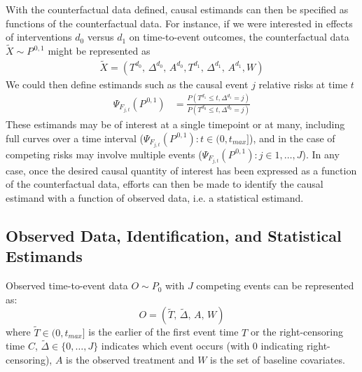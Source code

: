 \documentclass{report}
\newcommand{\1}{\ensuremath{\mathbf{1}}}
\newcommand{\T}{\ensuremath{\widetilde{T}}}
\renewcommand{\L}{\ensuremath{W}}
\newcommand{\tDelta}{\ensuremath{\widetilde{\Delta}}}
\begin{document}
With the counterfactual data defined, causal estimands can then be specified as functions of the counterfactual data. For instance, if we were interested in effects of interventions \(d_0\) versus \(d_1\) on time-to-event outcomes, the counterfactual data \(\tilde{X} \sim P^{\,0,1}\) might be represented as
\begin{align*}
\tilde{X} = \left(T^{d_0},\, \Delta^{d_0},\, A^{d_0}, T^{d_1},\, \Delta^{d_1},\, A^{d_1}, \L \right)
\end{align*}
We could then define estimands such as the causal event \(j\) relative risks at time \(t\) 
\begin{align}
\Psi_{F_{j,t}}(P^{\,0,1}) &= \frac{{P}(T^{d_1} \leq t, \Delta^{d_1} = j)}{{P}(T^{d_{0}} \leq t, \Delta^{d_{0}} = j)}
\label{causalrisk}
\end{align}
These estimands may be of interest at a single timepoint or at many, including full curves over a time interval (\(\Psi_{F_{j,t}}(P^{\,0,1}) : t \in (0, t_{max}]\)), and in the case of competing risks may involve multiple events (\(\Psi_{F_{j,t}}(P^{\,0, 1}) : j \in 1, \dots, J\)). In any case, once the desired causal quantity of interest has been expressed as a function of the counterfactual data, efforts can then be made to identify the causal estimand with a function of observed data, i.e. a statistical estimand.

\subsection{Observed Data, Identification, and Statistical Estimands}
\label{ObservedData}
Observed time-to-event data \(O \sim P_0\) with \(J\) competing events can be represented as:
\begin{equation}
 O = \left(\T,\, \tDelta,\, A,\, \L \right) \label{obs-data}
\end{equation}
where \(\T \in (0, t_{max}]\) is the earlier of the first event time \(T\) or the right-censoring time \(C\), \(\tDelta \in \{0, \dots, J\}\) indicates which event occurs (with 0 indicating right-censoring), \(A\) is the observed treatment and \(\L\) is the set of baseline covariates.
\end{document}
